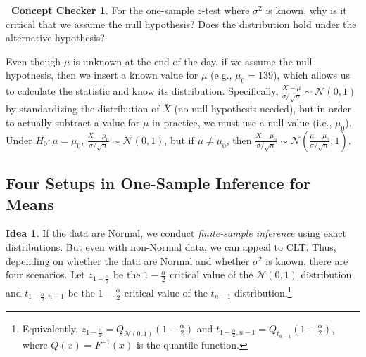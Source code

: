 \documentclass[12pt,oneside]{article}
\newcommand{\N}{\mathcal{N}}
\theoremstyle{definition}
\newtheorem{concept}{\faPen \ Concept Checker}
\newtheorem*{idea}{Idea}
\theoremstyle{remark}
\begin{document}
\begin{concept}
For the one-sample $z$-test where $\sigma^2$ is known, why is it critical that we assume the null hypothesis? Does the distribution hold under the alternative hypothesis?
\end{concept}

\begin{solutionbox}
Even though $\mu$ is unknown at the end of the day, if we assume the null hypothesis, then we insert a known value for $\mu$ (e.g., $\mu_0 = 139$), which allows us to calculate the statistic and know its distribution. Specifically, $\frac{\bar{X} - \mu}{\sigma / \sqrt{n}} \sim \N(0, 1)$ by standardizing the distribution of $\bar{X}$ (no null hypothesis needed), but in order to actually subtract a value for $\mu$ in practice, we must use a null value (i.e., $\mu_0$). Under $H_0: \mu = \mu_0$, $\frac{\bar{X} - \mu_0}{\sigma / \sqrt{n}} \sim \N(0, 1)$, but if $\mu \neq \mu_0$, then $\frac{\bar{X} - \mu_0}{\sigma / \sqrt{n}} \sim \N \left( \frac{\mu - \mu_0}{\sigma / \sqrt{n}}, 1 \right)$.
\end{solutionbox}

\subsection{Four Setups in One-Sample Inference for Means}

\begin{idea}
If the data are Normal, we conduct \textit{finite-sample inference} using exact distributions. But even with non-Normal data, we can appeal to CLT. Thus, depending on whether the data are Normal and whether $\sigma^2$ is known, there are four scenarios. Let $z_{1 - \frac{\alpha}{2}}$ be the $1 - \frac{\alpha}{2}$ critical value of the $\N(0, 1)$ distribution and $t_{1 - \frac{\alpha}{2}, n - 1}$ be the $1 - \frac{\alpha}{2}$ critical value of the $t_{n - 1}$ distribution.\footnote{Equivalently, $z_{1 - \frac{\alpha}{2}} = Q_{\N(0, 1)}(1 - \frac{\alpha}{2})$ and $t_{1 - \frac{\alpha}{2}, n - 1} = Q_{t_{n - 1}}(1 - \frac{\alpha}{2})$, where $Q(x) = F^{-1}(x)$ is the quantile function.}
\end{idea}
\end{document}
